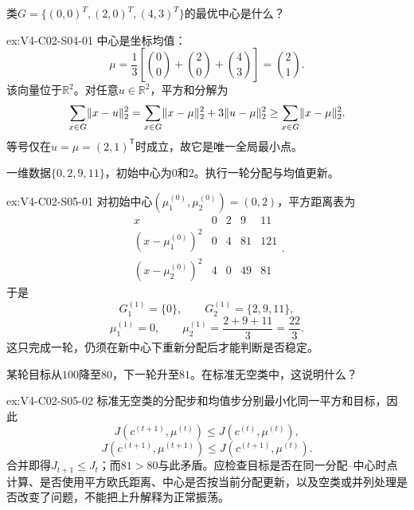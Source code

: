 \begin{SLChapterExercisePairSection}
\begin{exercise}\label{ex:V4-C02-S04-01}
类$G=\{(0,0)^T,(2,0)^T,(4,3)^T\}$的最优\kMeans{}中心是什么？
\end{exercise}
\ifSLFullEdition
{}\label{sol:V4-C02-S04-01}
\begin{chapterexercisesolution}{ex:V4-C02-S04-01}
中心是坐标均值：
\[
\mu=\frac13\left[\binom00+\binom20+\binom43\right]=\binom21.
\]
该向量位于$\mathbb R^2$。对任意$u\in\mathbb R^2$，平方和分解为
\[
\sum_{x\in G}\lVert x-u\rVert_2^2
=\sum_{x\in G}\lVert x-\mu\rVert_2^2+3\lVert u-\mu\rVert_2^2
\ge\sum_{x\in G}\lVert x-\mu\rVert_2^2.
\]
等号仅在$u=\mu=(2,1)^{\mathsf T}$时成立，故它是唯一全局最小点。
\end{chapterexercisesolution}
\fi

\begin{exercise}\label{ex:V4-C02-S05-01}
一维数据$\{0,2,9,11\}$，初始中心为$0$和$2$。执行一轮分配与均值更新。
\end{exercise}
\ifSLFullEdition
{}\label{sol:V4-C02-S05-01}
\begin{chapterexercisesolution}{ex:V4-C02-S05-01}
对初始中心$(\mu_1^{(0)},\mu_2^{(0)})=(0,2)$，平方距离表为
\[
\begin{array}{c|rrrr}
x&0&2&9&11\\\hline
(x-\mu_1^{(0)})^2&0&4&81&121\\
(x-\mu_2^{(0)})^2&4&0&49&81
\end{array}.
\]
于是
\[
G_1^{(1)}=\{0\},
\qquad
G_2^{(1)}=\{2,9,11\},
\]
\[
\mu_1^{(1)}=0,
\qquad
\mu_2^{(1)}=\frac{2+9+11}{3}=\frac{22}{3}.
\]
这只完成一轮，仍须在新中心下重新分配后才能判断是否稳定。
\end{chapterexercisesolution}
\fi

\begin{exercise}\label{ex:V4-C02-S05-02}
某轮目标从$100$降至$80$，下一轮升至$81$。在标准无空类\kMeans{}中，这说明什么？
\end{exercise}
\ifSLFullEdition
{}\label{sol:V4-C02-S05-02}
\begin{chapterexercisesolution}{ex:V4-C02-S05-02}
标准无空类\kMeans{}的分配步和均值步分别最小化同一平方和目标，因此
\[
J(c^{(t+1)},\mu^{(t)})
\le J(c^{(t)},\mu^{(t)}),
\]
\[
J(c^{(t+1)},\mu^{(t+1)})
\le J(c^{(t+1)},\mu^{(t)}).
\]
合并即得$J_{t+1}\le J_t$；而$81>80$与此矛盾。应检查目标是否在同一分配--中心时点计算、是否使用平方欧氏距离、中心是否按当前分配更新，以及空类或并列处理是否改变了问题，不能把上升解释为正常振荡。
\end{chapterexercisesolution}
\fi

\end{SLChapterExercisePairSection}
